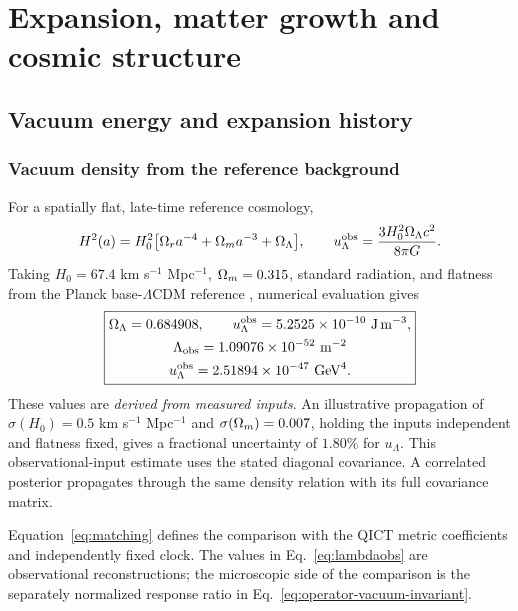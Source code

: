 \section{Expansion, matter growth and cosmic structure}\label{sec:structure}
\subsection{Vacuum energy and expansion history}

\subsubsection{Vacuum density from the reference background}
For a spatially flat, late-time reference cosmology,
\begin{equation}
H^2(a)=H_0^2\bigl[\Omega_ra^{-4}+\Omega_ma^{-3}+\Omega_\Lambda\bigr],\qquad
u_\Lambda^{\rm obs}=\frac{3H_0^2\Omega_\Lambda c^2}{8\pi G}.
\end{equation}
Taking $H_0=67.4$ km s$^{-1}$ Mpc$^{-1}$, $\Omega_m=0.315$, standard radiation, and flatness from the Planck base-$\Lambda$CDM reference \cite{Planck}, numerical evaluation gives
\begin{equation}\label{eq:lambdaobs}
\boxed{\begin{gathered}
\Omega_\Lambda=0.684908,\qquad
u_\Lambda^{\rm obs}=5.2525\times10^{-10}\ \mathrm{J\,m^{-3}},\\
\Lambda_{\rm obs}=1.09076\times10^{-52}\ \mathrm{m^{-2}}\\
u_\Lambda^{\rm obs}=2.51894\times10^{-47}\ \mathrm{GeV}^4.
\end{gathered}}
\end{equation}
These values are \emph{derived from measured inputs}. An illustrative propagation of $\sigma(H_0)=0.5$ km s$^{-1}$ Mpc$^{-1}$ and $\sigma(\Omega_m)=0.007$, holding the inputs independent and flatness fixed, gives a fractional uncertainty of $1.80\%$ for $u_\Lambda$. This observational-input estimate uses the stated diagonal covariance. A correlated posterior propagates through the same density relation with its full covariance matrix.

Equation~\eqref{eq:matching} defines the comparison with the QICT metric coefficients and independently fixed clock. The values in Eq.~\eqref{eq:lambdaobs} are observational reconstructions; the microscopic side of the comparison is the separately normalized response ratio in Eq.~\eqref{eq:operator-vacuum-invariant}.

